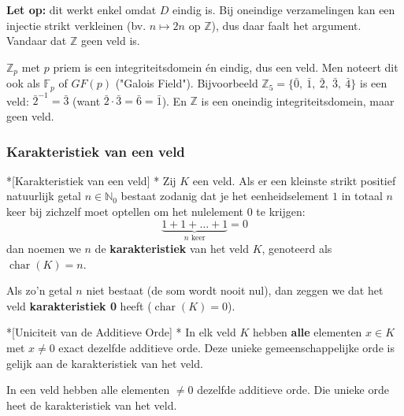 \begin{barbox}[WildStrawberry][gray!3]
    \textcolor{WildStrawberry}{\textbf{Let op:}} dit werkt enkel omdat $D$ eindig is. Bij oneindige verzamelingen kan een injectie strikt verkleinen (bv. $n \mapsto 2n$ op $\mathbb{Z}$), dus daar faalt het argument. Vandaar dat $\mathbb{Z}$ geen veld is.
\end{barbox}

\textbf{} $\mathbb{Z}_p$ met $p$ priem is een integriteitsdomein én eindig, dus een veld. Men noteert dit ook als $\mathbb{F}_p$ of $GF(p)$ ("Galois Field"). Bijvoorbeeld $\mathbb{Z}_5 = \{\bar{0},\ \bar{1},\ \bar{2},\ \bar{3},\ \bar{4}\}$ is een veld: $\bar{2}^{-1} = \bar{3}$ (want $\bar{2}\cdot \bar{3} = \bar{6} = \bar{1}$). En $\mathbb{Z}$ is een oneindig integriteitsdomein, maar geen veld.

\subsubsection{Karakteristiek van een veld}

\begin{nicedefinition}*[Karakteristiek van een veld]
    \nextpart[]*
    Zij $K$ een veld. Als er een kleinste strikt positief natuurlijk getal $n \in \mathbb{N}_0$ bestaat zodanig dat je het eenheidselement $1$ in totaal $n$ keer bij zichzelf moet optellen om het nulelement $0$ te krijgen:
    \begin{equation*}
        \underbrace{1 + 1 + \dots + 1}_{n \text{ keer}} = 0
    \end{equation*}
    dan noemen we $n$ de \textcolor{PineGreen!75!black}{\textbf{karakteristiek}} van het veld $K$, genoteerd als $\operatorname{char}(K) = n$.
    
    Als zo'n getal $n$ niet bestaat (de som wordt nooit nul), dan zeggen we dat het veld \textcolor{PineGreen!75!black}{\textbf{karakteristiek 0}} heeft ($\operatorname{char}(K) = 0$).
\end{nicedefinition}

\begin{nicetheorem}*[Uniciteit van de Additieve Orde]
    \nextpart[]*
    In elk veld $K$ hebben \textbf{alle} elementen $x \in K$ met $x \neq 0$ exact dezelfde additieve orde. Deze unieke gemeenschappelijke orde is gelijk aan de karakteristiek van het veld.
\end{nicetheorem}

\textbf{} In een veld hebben alle elementen $\neq 0$ dezelfde additieve orde. Die unieke orde heet de karakteristiek van het veld. 

